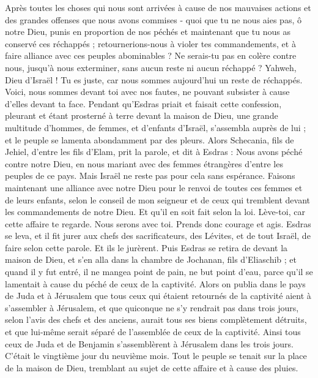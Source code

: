 \begin{multicols}{2}
Après toutes les choses qui nous sont arrivées à cause de nos mauvaises actions et des grandes offenses que nous avons commises - quoi que tu ne nous aies pas, ô notre Dieu, punis en proportion de nos péchés et maintenant que  tu nous as conservé ces réchappés ; 
retournerions-nous à violer tes commandements, et à faire alliance avec ces peuples abominables ? Ne serais-tu pas en colère contre nous, jusqu'à nous exterminer, sans aucun reste ni aucun réchappé ?
Yahweh, Dieu d'Israël ! Tu es juste, car nous sommes aujourd'hui un reste de réchappés. Voici, nous sommes devant toi avec nos fautes, ne pouvant subsister à cause d’elles devant ta face.
\VerseOne{}Pendant qu’Esdras priait et faisait cette confession, pleurant et étant prosterné à terre devant la maison de Dieu, une grande multitude d'hommes, de femmes, et d’enfants d'Israël, s'assembla auprès de lui ; et le peuple se lamenta abondamment par des pleurs.
Alors Schecania, fils de Jehiel, d'entre les fils d’Elam, prit la parole, et dit à Esdras : Nous avons péché contre notre Dieu, en nous mariant avec des femmes étrangères d'entre les peuples de ce pays. Mais Israël ne reste pas pour cela sans espérance.
Faisons maintenant une alliance avec notre Dieu pour le renvoi de toutes ces femmes et de leurs enfants, selon le conseil de mon seigneur et de ceux qui tremblent devant les commandements de notre Dieu. Et qu'il en soit fait selon la loi.
Lève-toi, car cette affaire te regarde. Nous serons avec toi. Prends donc courage et agis.
Esdras se leva, et il fit jurer aux chefs des sacrificateurs, des Lévites, et de tout Israël, de faire selon cette parole. Et ils le jurèrent.
Puis Esdras se retira de devant la maison de Dieu, et s'en alla dans la chambre de Jochanan, fils d'Eliaschib ; et quand il y fut entré, il ne mangea point de pain, ne but point d'eau, parce qu'il se lamentait à cause du péché de ceux de la captivité.
Alors on publia dans le pays de Juda et à Jérusalem que tous ceux qui étaient retournés de la captivité aient à s'assembler à Jérusalem,
et que quiconque ne s'y rendrait pas dans trois jours, selon l'avis des chefs et des anciens, aurait tous ses biens complètement détruits, et que lui-même serait séparé de l'assemblée de ceux de la captivité.
Ainsi tous ceux de Juda et de Benjamin s'assemblèrent à Jérusalem dans les trois jours. C’était le vingtième jour du neuvième mois. Tout le peuple se tenait sur la place de la maison de Dieu, tremblant au sujet de cette affaire et à cause des pluies.

\end{multicols}

